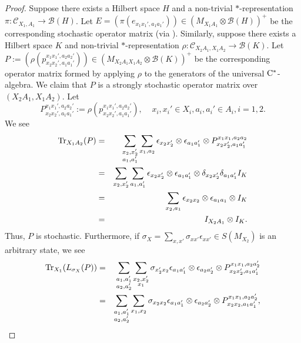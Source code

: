 \documentclass[11pt]{amsart}
\newcommand{\cl}[1]{\mathcal{#1}}
\begin{document}
\begin{proof}
Suppose there exists a Hilbert space $H$ and a non-trivial $*$-representation $\pi: \cl{C}_{X_{1}, A_{1}}\rightarrow \cl{B}(H)$. Let $E = (\pi(e_{x_{1}x_{1}', a_{1}a_{1}'})) \in (M_{X_{1}A_{1}}\otimes \cl{B}(H))^{+}$ be the corresponding stochastic operator matrix (via \cite[Theorem 5.2]{tt}). Similarly, suppose there exists a Hilbert space $K$ and non-trivial $*$-representation $\rho: \cl{C}_{X_{2}A_{1}, X_{1}A_{2}}\rightarrow \cl{B}(K)$. Let $P := (\rho(p_{x_{2}x_{2}', a_{1}a_{1}'}^{x_{1}x_{1}', a_{2}a_{2}'})) \in (M_{X_{2}A_{1}X_{1}A_{2}}\otimes \cl{B}(K))^{+}$ be the corresponding operator matrix formed by applying $\rho$ to the generators of the universal ${\rm C}^{*}$-algebra. We claim that $P$ is a strongly stochastic operator matrix over $(X_{2}A_{1}, X_{1}A_{2})$. Let $$ P_{x_{2}x_{2}', a_{1}a_{1}'}^{x_{1}x_{1}', a_{2}a_{2}'} := \rho(p_{x_{2}x_{2}', a_{1}a_{1}'}^{x_{1}x_{1}', a_{2}a_{2}'}), \;\;\;\; x_{i}, x_{i}' \in X_{i}, a_{i}, a_{i}' \in A_{i}, i = 1, 2.$$
We see
\begin{eqnarray*}
{\rm Tr}_{X_{1}A_{2}}(P) 
& = &
\sum\limits_{\substack{x_{2}, x_{2}' \\ a_{1}, a_{1}'}}\sum\limits_{x_{1}, a_{2}}\epsilon_{x_{2}x_{2}'}\otimes \epsilon_{a_{1}a_{1}'}\otimes P_{x_{2}x_{2}', a_{1}a_{1}'}^{x_{1}x_{1}, a_{2}a_{2}} \\
& = &
\sum\limits_{x_{2}, x_{2}'}\sum\limits_{a_{1}, a_{1}'}\epsilon_{x_{2}x_{2}'}\otimes \epsilon_{a_{1}a_{1}'}\otimes \delta_{x_{2}x_{2}'}\delta_{a_{1}a_{1}'}I_{K} \\
& = &
\sum\limits_{x_{2}, a_{1}}\epsilon_{x_{2}x_{2}}\otimes \epsilon_{a_{1}a_{1}}\otimes I_{K} \\
& = &
I_{X_{2}A_{1}}\otimes I_{K}.
\end{eqnarray*} 
\noindent Thus, $P$ is stochastic. Furthermore, if $\sigma_{X} = \sum_{x, x'}\sigma_{xx'}\epsilon_{xx'} \in S(M_{X_{2}})$ is an arbitrary state, we see
\begin{eqnarray*}
{\rm Tr}_{X_{1}}(L_{\sigma_{X}}(P)) 
& = &
\sum\limits_{\substack{a_{1}, a_{1}' \\ a_{2}, a_{2}'}}\sum\limits_{\substack{x_{2}, x_{2}' \\ x_{1}}}\sigma_{x_{2}'x_{2}}\epsilon_{a_{1}a_{1}'}\otimes \epsilon_{a_{2}a_{2}'}\otimes P_{x_{2}x_{2}', a_{1}a_{1}'}^{x_{1}x_{1}, a_{2}a_{2}'} \\
& = &
\sum\limits_{\substack{a_{1}, a_{1}' \\ a_{2}, a_{2}'}}\sum\limits_{x_{1}, x_{2}}\sigma_{x_{2}x_{2}}\epsilon_{a_{1}a_{1}'}\otimes \epsilon_{a_{2}a_{2}'}\otimes P_{x_{2}x_{2}, a_{1}a_{1}'}^{x_{1}x_{1}, a_{2}a_{2}'},

\end{eqnarray*}
\end{proof}
\end{document}
